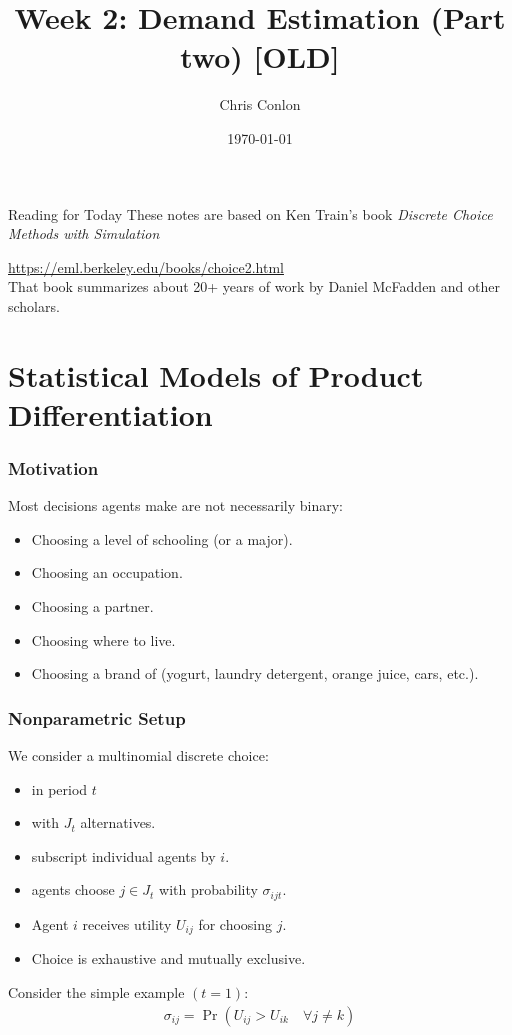 \documentclass[aspectratio=169,11pt]{beamer}
\title{Week 2: Demand Estimation (Part two) [OLD]}
\author{Chris Conlon}
\institute{Grad IO}
\date{\today}
\begin{document}
\frame{\titlepage}

\begin{frame}{Reading for Today}
These notes are based on Ken Train's book \textit{Discrete Choice Methods with Simulation}

\url{https://eml.berkeley.edu/books/choice2.html}\\

That book summarizes about 20+ years of work by Daniel McFadden and other scholars.

\end{frame}


\section{Statistical Models of Product Differentiation}
\begin{frame}
\frametitle{Motivation}
Most decisions agents make are not necessarily binary:
\begin{itemize}
\item Choosing a level of schooling (or a major).
\item Choosing an occupation.
\item Choosing a partner.
\item Choosing where to live.
\item Choosing a brand of (yogurt, laundry detergent, orange juice, cars, etc.).
 \end{itemize}
\end{frame}

\begin{frame}
\frametitle{Nonparametric Setup}
We consider a \alert{multinomial discrete choice}:
\begin{itemize}
\item in period $t$
\item with $J_t$ alternatives.
\item subscript individual agents by $i$.
\item agents choose $j \in J_t$ with probability $\sigma_{ijt}$.
\item Agent $i$ receives utility $U_{ij}$ for choosing $j$.
\item Choice is exhaustive and mutually exclusive.
 \end{itemize}\pause
Consider the simple example $(t=1)$:
\begin{eqnarray*}
\sigma_{ij} = \Pr( U_{ij} > U_{ik} \quad \forall j \neq k)
\end{eqnarray*}
\end{frame}
\end{document}
